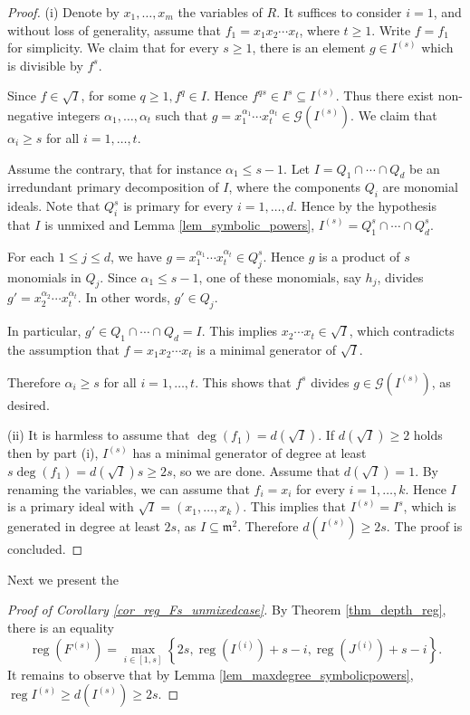\documentclass{amsart}
\DeclareMathOperator{\reg}{reg}
\newcommand{\Gcc}{\mathcal{G}}
\newcommand{\mm}{\mathfrak{m}}
\theoremstyle{plain}
\theoremstyle{definition}
\numberwithin{equation}{section}
\begin{document}
\begin{proof}
 (i) Denote by $x_1,\ldots,x_m$ the variables of $R$. It suffices to consider $i=1$, and without loss of generality, assume that $f_1=x_1x_2\cdots x_t$, where $t\ge 1$. Write $f=f_1$ for simplicity. We claim that for every $s\ge 1$, there is an element $g\in I^{(s)}$ which is divisible by $f^s$.
 
 Since $f\in \sqrt{I}$, for some $q\ge 1, f^q\in I$. Hence $f^{qs} \in I^s \subseteq I^{(s)}$. Thus there exist non-negative integers $\alpha_1,\ldots,\alpha_t$ such that $g=x_1^{\alpha_1}\cdots x_t^{\alpha_t}\in \Gcc(I^{(s)})$. We claim that $\alpha_i\ge s$ for all $i=1,\ldots,t$.
 
 Assume the contrary, that for instance $\alpha_1\le s-1$. Let $I=Q_1\cap \cdots \cap Q_d$ be an irredundant primary decomposition of $I$, where the components $Q_i$ are monomial ideals. Note that $Q_i^s$ is primary for every $i=1,\ldots,d$. Hence by the hypothesis that $I$ is unmixed and Lemma \ref{lem_symbolic_powers}, $I^{(s)}=Q_1^s\cap \cdots \cap Q_d^s$.
 
For each $1\le j\le d$, we have $g=x_1^{\alpha_1}\cdots x_t^{\alpha_t}\in Q_j^s$. Hence $g$ is a product of $s$ monomials in $Q_j$. Since $\alpha_1\le s-1$, one of these monomials, say $h_j$, divides $g'=x_2^{\alpha_2}\cdots x_t^{\alpha_t}$. In other words, $g'\in Q_j$.

In particular, $g'\in Q_1\cap \cdots \cap Q_d=I$. This implies $x_2\cdots x_t\in \sqrt{I}$, which contradicts the assumption that $f=x_1x_2\cdots x_t$ is a minimal generator of $\sqrt{I}$.

Therefore $\alpha_i\ge s$ for all $i=1,\ldots,t$. This shows that $f^s$ divides $g\in \Gcc( I^{(s)})$, as desired.

(ii) It is harmless to assume that $\deg(f_1)=d(\sqrt{I})$. If $d(\sqrt{I})\ge 2$ holds then by part (i), $I^{(s)}$ has a minimal generator of degree at least $s\deg(f_1)=d(\sqrt{I})s \ge 2s$, so we are done. Assume that $d(\sqrt{I})=1$. By renaming the variables, we can assume that $f_i=x_i$ for every $i=1,\ldots,k$. Hence $I$ is a primary ideal with $\sqrt{I}=(x_1,\ldots,x_k)$. This implies that $I^{(s)}=I^s$, which is generated in degree at least $2s$, as $I\subseteq \mm^2$. Therefore $d( I^{(s)}) \ge 2s$. The proof is concluded.
\end{proof}
Next we present the

\begin{proof}[Proof of Corollary \ref{cor_reg_Fs_unmixedcase}]
By Theorem \ref{thm_depth_reg}, there is an equality
$$
\reg (F^{(s)})=\max\limits_{i\in [1,s]}\left\{2s,\reg(I^{(i)})+s-i, \reg(J^{(i)})+s-i \right\}.
$$
It remains to observe that by Lemma \ref{lem_maxdegree_symbolicpowers}, $\reg I^{(s)}\ge d(I^{(s)}) \ge 2s$.
\end{proof}
\end{document}
